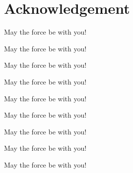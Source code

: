 %
\chapter*{Acknowledgement}
\label{sec:acknowledgement}
\vspace*{-10mm}

May the force be with you!

May the force be with you!

May the force be with you!

May the force be with you!

May the force be with you!

May the force be with you!

May the force be with you!

May the force be with you!

May the force be with you!